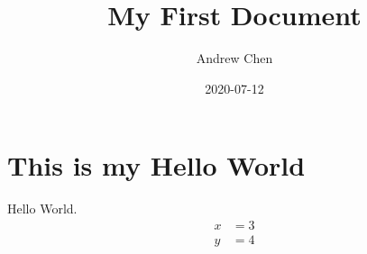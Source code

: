 \documentclass{article}
\title{My First Document}
\date{2020-07-12}
\author{Andrew Chen}
\begin{document}
	\maketitle
	\newpage
	\section{This is my Hello World}
	Hello World. 
	\begin{align}
		x &= 3\\
		y &= 4
	\end{align}
\end{document}
